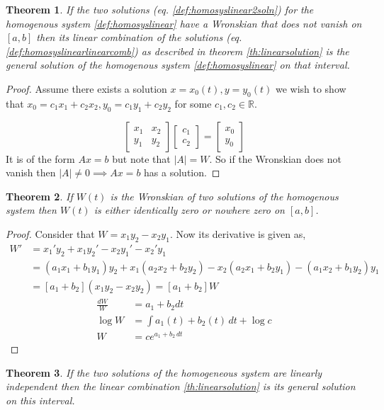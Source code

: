 \documentclass[oneside,11pt,pdftex,final]{book}%
\numberwithin{equation}{section}
\newtheorem{theorem}{Theorem}[chapter]%
\numberwithin{section}{chapter}
\numberwithin{equation}{chapter}
\newcommand{\R}{\mathbb{R}}
\begin{document}
\begin{theorem}
	If the two solutions (eq. \ref{def:homosyslinear2soln}) for the homogenous system \ref{def:homosyslinear} have a Wronskian that does not vanish on $ [a,b] $ then its linear combination of the solutions (eq. \ref{def:homosyslinearlinearcomb}) as described in theorem \ref{th:linearsolution} is the general solution of the homogenous system \ref{def:homosyslinear} on that interval.
\end{theorem}
\begin{proof}
	Assume there exists a solution $ x=x_0(t),y=y_0(t) $ we wish to show that $ x_0=c_1x_1+c_2x_2, y_0=c_1y_1+c_2y_2 $ for some $ c_1,c_2 \in \R  $.
	
	\[ \begin{bmatrix}
		x_1 & x_2\\
		y_1 & y_2
	\end{bmatrix} \begin{bmatrix}
	c_1 \\
	c_2
\end{bmatrix} = \begin{bmatrix}
x_0\\
y_0
\end{bmatrix}\]
	It is of the form $ Ax=b $ but note that $ |A|=W $. So if the Wronskian does not vanish then $ |A|\neq0 \implies Ax=b$ has a solution.
\end{proof}
\begin{theorem}
	If $ W(t) $ is the Wronskian of two solutions of the homogenous system then $ W(t) $ is either identically zero or nowhere zero on $ [a,b] $.
\end{theorem}
\begin{proof}
	Consider that $ W=x_1y_2-x_2y_1 $. Now its derivative is given as,
	\begin{align*}
		W'&=x_1'y_2+x_1y_2'-x_2y_1'-x_2'y_1\\
		&=(a_1x_1+b_1y_1)y_2+x_1(a_2x_2+b_2y_2)-x_2(a_2	x_1+b_2y_1)-(a_1x_2+b_1y_2)y_1\\
		&=[a_1+b_2](x_1y_2-x_2y_2)=[a_1+b_2]W
	\end{align*}
\begin{align*}
		\frac{dW}{W}&=a_1+b_2 dt\\
	\log W &= \int a_1(t)+b_2(t)\, dt + \log c\\
	W&=ce^{a_1+b_2 \, dt}
\end{align*}
\end{proof}
\begin{theorem}
	If the two solutions of the homogeneous system are linearly independent then the linear combination \ref{th:linearsolution} is its general solution on this interval.
\end{theorem}
\end{document}
